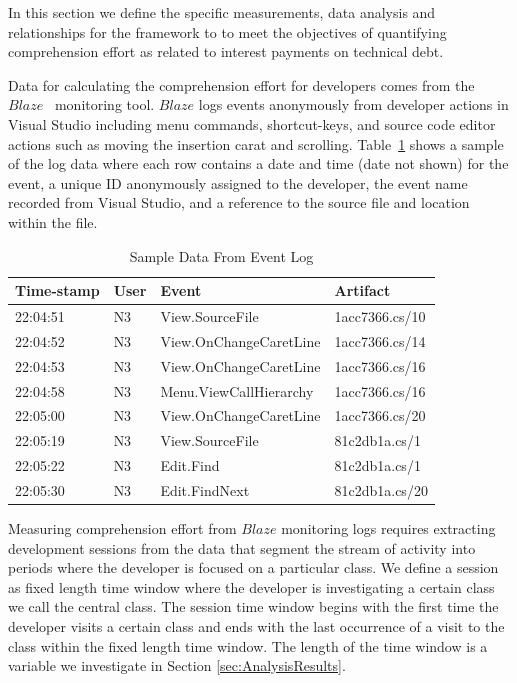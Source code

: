 In this section we define the specific measurements, data analysis and relationships for the framework to to meet the objectives of quantifying comprehension effort as related to interest payments on technical debt.

Data for calculating the comprehension effort for developers comes from the $Blaze$~\cite{Snipes_etal:2014} monitoring tool.  $Blaze$ logs events anonymously from developer actions in Visual Studio including menu commands, shortcut-keys, and source code editor actions such as moving the insertion carat and scrolling.  Table~\ref{fig:SampleEventData} shows a sample of the log data where each row contains a date and time (date not shown) for the event, a unique ID anonymously assigned to the developer, the event name recorded from Visual Studio, and a reference to the source file and location within the file.

\begin{table}
	\centering
	\caption{Sample Data From Event Log}
	\begin{tabular}{|l|l|l|l|}
	\hline

Time-stamp & User & Event & Artifact \\
\hline\hline
22:04:51 & N3 & View.SourceFile & 1acc7366.cs/10 \\
\hline
22:04:52 & N3 & View.OnChangeCaretLine & 1acc7366.cs/14 \\
\hline
22:04:53 & N3 & View.OnChangeCaretLine & 1acc7366.cs/16 \\
\hline
22:04:58 & N3 & Menu.ViewCallHierarchy & 1acc7366.cs/16 \\
\hline
22:05:00 & N3 & View.OnChangeCaretLine & 1acc7366.cs/20 \\
\hline
22:05:19 & N3 & View.SourceFile & 81c2db1a.cs/1 \\
\hline
22:05:22 & N3 & Edit.Find & 81c2db1a.cs/1 \\
\hline
22:05:30 & N3 & Edit.FindNext & 81c2db1a.cs/20 \\
\hline

	\end{tabular}
	\label{fig:SampleEventData}
\end{table}

Measuring comprehension effort from $Blaze$ monitoring logs requires extracting development sessions from the data that segment the stream of activity into periods where the developer is focused on a particular class.  We define a session as fixed length time window where the developer is investigating a certain class we call the central class.  The session time window begins with the first time the developer visits a certain class and ends with the last occurrence of a visit to the class within the fixed length time window.  The length of the time window is a variable we investigate in Section \ref{sec:AnalysisResults}.  

